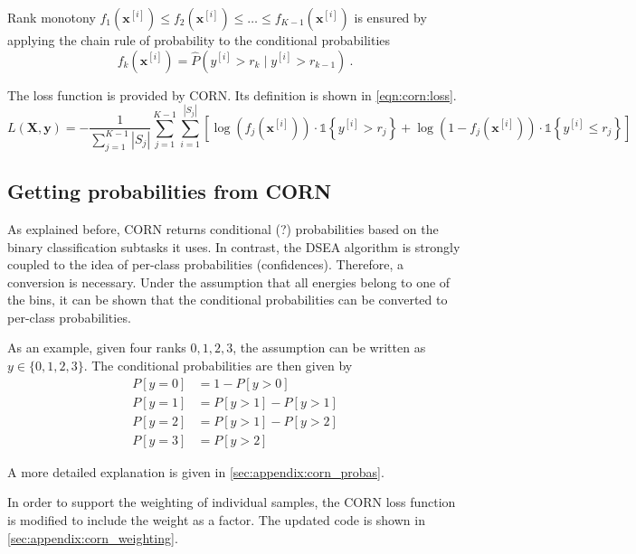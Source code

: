 Rank monotony
  $f_1(\mathbf{x}^{[i]}) \leq f_2(\mathbf{x}^{[i]}) \leq \ldots \leq f_{K-1}(\mathbf{x}^{[i]})$
is ensured by
applying the chain rule of probability
to the conditional probabilities
\begin{equation}
  f_k(\mathbf{x}^{[i]}) = \hat{P}\left( y^{[i]} > r_k \mid y^{[i]} > r_{k-1} \right) \ .
\end{equation}




The loss function is provided by CORN.
Its definition is shown in \autoref{eqn:corn:loss}.
\begin{equation}
  \label{eqn:corn:loss}
  L(\mathbf{X}, \mathbf{y}) =
  - \frac{1}{\sum_{j=1}^{K-1} |S_j|}
  \sum_{j=1}^{K-1}
  \sum_{i=1}^{|S_j|}
  \left[
    \log(f_j(\mathbf{x}^{[i]})) · \mathbb{1}\left\{y^{[i]} > r_j\right\}
    +
    \log(1 - f_j(\mathbf{x}^{[i]})) · \mathbb{1}\left\{y^{[i]} \leq r_j\right\}
  \right]
\end{equation}


\subsection{Getting probabilities from CORN} %
As explained before,
CORN returns conditional (?) probabilities based on the binary classification subtasks it uses.
In contrast,
the DSEA algorithm is strongly coupled to the idea of per-class probabilities (confidences).
Therefore, a conversion is necessary.
Under the assumption that all energies belong to one of the bins,
it can be shown that the conditional probabilities can be converted to per-class probabilities.

As an example, given four ranks $0, 1, 2, 3$,
the assumption can be written as $y \in \{0, 1, 2, 3\}$.
The conditional probabilities are then given by
\begin{align*}
  P[y=0] &= 1 - P[y>0] \\
  P[y=1] &= P[y>1] - P[y>1] \\
  P[y=2] &= P[y>1] - P[y>2] \\
  P[y=3] &= P[y>2]
\end{align*}

A more detailed explanation is given in \autoref{sec:appendix:corn_probas}.

In order to support the weighting of individual samples,
the CORN loss function is modified
to include the weight as a factor.
The updated code is shown in \autoref{sec:appendix:corn_weighting}.
